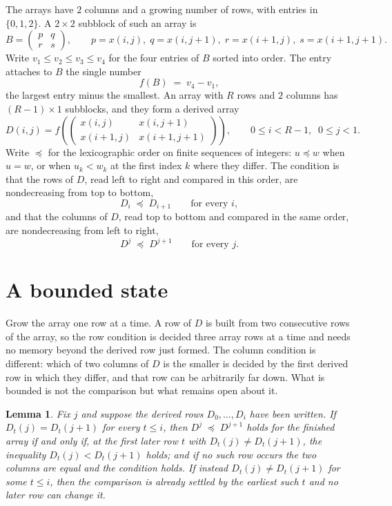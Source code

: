 \documentclass[11pt,a4paper]{article}
\theoremstyle{plain}
\newtheorem{lemma}[theorem]{Lemma}
\theoremstyle{definition}
\begin{document}
The arrays have $2$ columns and a growing number of rows, with entries in $\{0,1,2\}$. A
$2\times2$ subblock of such an array is
\[
B=\begin{pmatrix} p & q \\ r & s \end{pmatrix},
\qquad p=x(i,j),\; q=x(i,j+1),\; r=x(i+1,j),\; s=x(i+1,j+1).
\]
Write $v_1\le v_2\le v_3\le v_4$ for the four entries of $B$ sorted into order. The entry attaches to $B$ the single number
\[
f(B)\;=\;v_4-v_1,
\]
the largest entry minus the smallest. An array with $R$ rows and $2$ columns has $(R-1)\times1$ subblocks, and they
form a derived array
\[
D(i,j)=f\!\left(\begin{pmatrix} x(i,j) & x(i,j+1) \\ x(i+1,j) & x(i+1,j+1)\end{pmatrix}
\right),\qquad 0\le i<R-1,\;\; 0\le j<1 .
\]
Write $\preceq$ for the lexicographic order on finite sequences of integers: $u\preceq w$ when
$u=w$, or when $u_k<w_k$ at the first index $k$ where they differ. The condition is that the
rows of $D$, read left to right and compared in this order, are nondecreasing from top to bottom,
\[
D_{i}\;\preceq\;D_{i+1}\qquad\text{for every } i,
\]
and that the columns of $D$, read top to bottom and compared in the same order, are nondecreasing
from left to right,
\[
D^{j}\;\preceq\;D^{j+1}\qquad\text{for every } j .
\]

\section{A bounded state}

Grow the array one row at a time. A row of $D$ is built from two consecutive rows of the array,
so the row condition is decided three array rows at a time and needs no memory beyond the
derived row just formed. The column condition is different: which of two columns of $D$ is the
smaller is decided by the first derived row in which they differ, and that row can be
arbitrarily far down. What is bounded is not the comparison but what remains open about it.

\begin{lemma}\label{lem:bits}
Fix $j$ and suppose the derived rows $D_0,\dots,D_i$ have been written. If $D_t(j)=D_t(j+1)$ for
every $t\le i$, then $D^{j}\;\preceq\;D^{j+1}$ holds for the finished array if and only if,
at the first later row $t$ with $D_t(j)\neq D_t(j+1)$, the inequality $D_t(j)<D_t(j+1)$
holds; and if no such row occurs the two columns are equal and the condition holds. If instead
$D_t(j)\neq D_t(j+1)$ for some $t\le i$, then the comparison is already settled by the earliest
such $t$ and no later row can change it.
\end{lemma}
\end{document}
